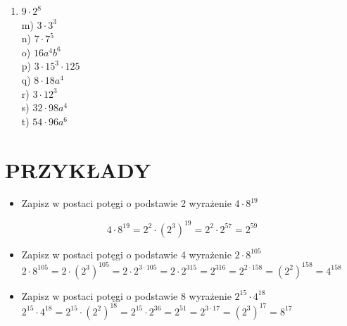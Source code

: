 \documentclass[10pt]{article}
\begin{document}
\begin{enumerate}
  \item \(9 \cdot 2^{8}\)\\
m) \(3 \cdot 3^{3}\)\\
n) \(7 \cdot 7^{5}\)\\
o) \(16 a^{4} b^{6}\)\\
p) \(3 \cdot 15^{3} \cdot 125\)\\
q) \(8 \cdot 18 a^{4}\)\\
r) \(3 \cdot 12^{3}\)\\
s) \(32 \cdot 98 a^{4}\)\\
t) \(54 \cdot 96 a^{6}\)
\end{enumerate}

\section*{PRZYKŁADY}
\begin{itemize}
  \item Zapisz w postaci potęgi o podstawie 2 wyrażenie \(4 \cdot 8^{19}\)
\end{itemize}

\[
4 \cdot 8^{19}=2^{2} \cdot\left(2^{3}\right)^{19}=2^{2} \cdot 2^{57}=2^{59}
\]

\begin{itemize}
  \item Zapisz w postaci potęgi o podstawie 4 wyrażenie \(2 \cdot 8^{105}\) \(2 \cdot 8^{105}=2 \cdot\left(2^{3}\right)^{105}=2 \cdot 2^{3 \cdot 105}=2 \cdot 2^{315}=2^{316}=2^{2 \cdot 158}=\left(2^{2}\right)^{158}=4^{158}\)
  \item Zapisz w postaci potęgi o podstawie 8 wyrażenie \(2^{15} \cdot 4^{18}\) \(2^{15} \cdot 4^{18}=2^{15} \cdot\left(2^{2}\right)^{18}=2^{15} \cdot 2^{36}=2^{51}=2^{3 \cdot 17}=\left(2^{3}\right)^{17}=8^{17}\)
\end{itemize}
\end{document}

